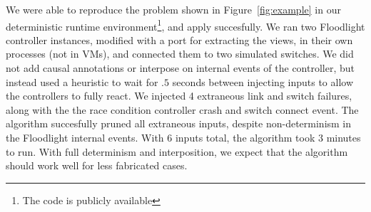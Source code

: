
We were able to reproduce the problem shown in Figure~\ref{fig:example} in our
deterministic runtime environment\footnote{The code is publicly available}, and apply \simulator{} succesfully.
We ran two Floodlight controller instances, modified with a port for
extracting the views, in their own processes (not in
VMs), and connected them to two simulated switches. We did not add causal
annotations or interpose on internal events of the controller, but instead used a
heuristic to wait for $.5$ seconds between injecting inputs to allow the
controllers to fully react. We injected 4 extraneous link and switch failures, along with the
the race condition controller crash and switch connect event.
The algorithm succesfully pruned all extraneous
inputs, despite non-determinism in the Floodlight internal events. With 6
inputs total, the algorithm took 3 minutes to run. With full determinism and
interposition, we expect that the algorithm should work well for less
fabricated cases.
